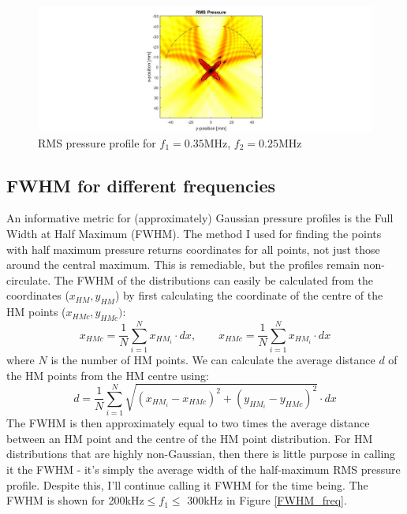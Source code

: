 \documentclass[10pt,a4paper]{article}
\begin{document}
\begin{figure}[!h]\label{f350kHz}
\hspace*{-5cm}                                                    
\includegraphics[scale=0.6]{f350kHz}
\caption{RMS pressure profile for $f_1 = 0.35$MHz, $f_2 = 0.25$MHz}
\end{figure}
\newpage

\subsection*{FWHM for different frequencies}

An informative metric for (approximately) Gaussian pressure profiles is the Full Width at Half Maximum (FWHM). The method I used for finding the points with half maximum pressure returns coordinates for all points, not just those around the central maximum. This is remediable, but the profiles remain non-circulate. The FWHM of the distributions can easily be calculated from the coordinates ($x_{HM},y_{HM}$) by first calculating the coordinate of the centre of the HM points ($x_{HMc}, y_{HMc})$:
\begin{equation}
x_{HMc} = \frac{1}{N} \sum_{i=1}^N x_{HM_i} \cdot dx, \quad \quad x_{HMc} = \frac{1}{N} \sum_{i=1}^N x_{HM_i} \cdot dx
\end{equation}
where $N$ is the number of HM points. We can calculate the average distance $d$ of the HM points from the HM centre using:
\begin{equation}
d = \frac{1}{N}  \sum_{i=1}^N \sqrt{ (x_{HM_i} - x_{HMc})^2 + (y_{HM_i} - y_{HMc})^2} \cdot dx 
\end{equation}
The FWHM is then approximately equal to two times the average distance between an HM point and the centre of the HM point distribution. For HM distributions that are highly non-Gaussian, then there is little purpose in calling it the FWHM - it's simply the average width of the half-maximum RMS pressure profile. Despite this, I'll continue calling it FWHM for the time being. The FWHM is shown for 200kHz$\leq f_1 \leq$ 300kHz in Figure \ref{FWHM_freq}.
\end{document}
